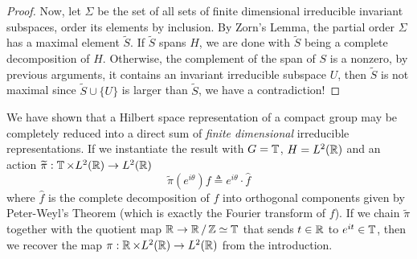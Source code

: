 \begin{proof}
  Now, let $\Sigma$ be the set of all sets of finite dimensional irreducible
  invariant subspaces, order its elements by inclusion.  By Zorn's Lemma, the
  partial order $\Sigma$ has a maximal element $\widetilde{S}$.  If
  $\widetilde{S}$ spans $H$, we are done with $\widetilde{S}$ being a complete
  decomposition of $H$.  Otherwise, the complement of the span of $S$ is a
  nonzero, by previous arguments, it contains an invariant irreducible subspace
  $U$, then $\widetilde{S}$ is not maximal since $\widetilde{S} \cup \{U\}$ is
  larger than $\widetilde{S}$, we have a contradiction!
\end{proof}

We have shown that a Hilbert space representation of a compact group may be
completely reduced into a direct sum of \emph{finite dimensional} irreducible
representations.  If we instantiate the result with $G = \operatorname{\mathbb{T}}$, $H = L^2(\operatorname{\mathbb{R}})$ and
an action $\widetilde{\pi} : \operatorname{\mathbb{T}} \times L^2(\operatorname{\mathbb{R}}) \to L^2(\operatorname{\mathbb{R}})$
\[
  \widetilde{\pi}(e^{i\theta})f \triangleq e^{i\theta} \cdot \hat{f}
\]
where $\hat{f}$ is the complete decomposition of $f$ into orthogonal components
given by Peter-Weyl's Theorem (which is exactly the Fourier transform of $f$).
If we chain $\widetilde{\pi}$ together with the quotient map $\operatorname{\mathbb{R}} \to \operatorname{\mathbb{R}}/\operatorname{\mathbb{Z}}
\simeq \operatorname{\mathbb{T}}$ that sends $t \in \operatorname{\mathbb{R}}$ to $e^{it} \in \operatorname{\mathbb{T}}$, then we recover the map
$\pi : \operatorname{\mathbb{R}} \times L^2(\operatorname{\mathbb{R}}) \to L^2(\operatorname{\mathbb{R}})$ from the introduction.
